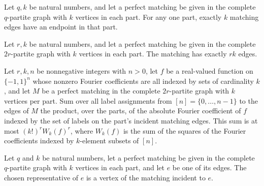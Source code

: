 \begin{theorem}
\label{FABL.card_graphMatchingPartEdges}
\leanok
{}
Let $q,k$ be natural numbers, and let a perfect matching be given in the complete
$q$-partite graph with $k$ vertices in each part. For any one part, exactly $k$ matching
edges have an endpoint in that part.
\end{theorem}

\begin{theorem}
\label{FABL.card_graphMatching_edgeSet}
\leanok
{}
Let $r,k$ be natural numbers, and let a perfect matching be given in the complete
$2r$-partite graph with $k$ vertices in each part. The matching has exactly $rk$ edges.
\end{theorem}

\begin{theorem}
\label{FABL.graphMatching_fixed_sum_le}
\leanok
{}
Let $r,k,n$ be nonnegative integers with $n>0$, let $f$ be a real-valued function on
$\{-1,1\}^n$ whose nonzero Fourier coefficients are all indexed by sets of cardinality
$k$, and let $M$ be a perfect matching in the complete $2r$-partite graph with $k$
vertices per part. Sum over all label assignments from $[n]=\{0,\ldots,n-1\}$ to the
edges of $M$ the product, over the parts, of the absolute Fourier coefficient of $f$
indexed by the set of labels on the part's incident matching edges. This sum is at most
$(k!)^r W_k(f)^r$, where $W_k(f)$ is the sum of the squares of the Fourier coefficients
indexed by $k$-element subsets of $[n]$.
\end{theorem}

\begin{definition}
\label{FABL.graphMatchingEdgeRepresentative}
\leanok
{}
Let $q$ and $k$ be natural numbers, let a perfect matching be given in the complete
$q$-partite graph with $k$ vertices in each part, and let $e$ be one of its edges. The
chosen representative of $e$ is a vertex of the matching incident to $e$.
\end{definition}


